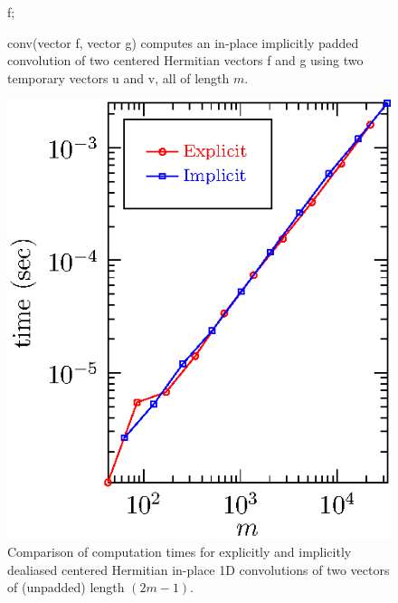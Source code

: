 \documentclass[final]{siamltex}
\begin{document}

\begin{figure}[htbp]
\begin{minipage}{.49\linewidth}
\begin{center}
\begin{function}[H]
  \medskip
  \Return f;
\caption{conv(vector {\sf f}, vector {\sf g}) computes
an in-place implicitly padded convolution of two centered Hermitian vectors
{\sf f} and {\sf g} using two temporary vectors {\sf u} and {\sf v}, all of length
$m$.}\label{conv}
\end{function}
\end{center}
\end{minipage}
\begin{minipage}{0.49\linewidth}
\begin{center}
\includegraphics{timing1r}
\caption{Comparison of computation times for explicitly and implicitly
dealiased centered Hermitian in-place 1D convolutions of two vectors of
(unpadded) length $(2m-1)$.}
\label{timing1r}
\end{center}
\end{minipage}
\end{figure}
\end{document}

